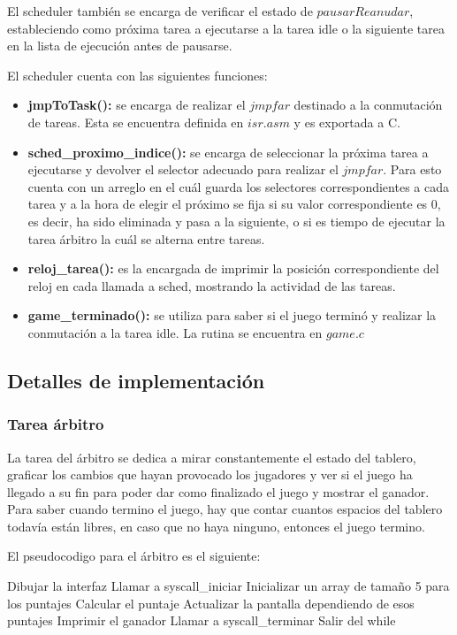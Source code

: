 \documentclass[a4paper,10pt,twoside]{article}
\newenvironment{pseudocodigo}
    {\vspace{0.5em} \begin{algorithmic}}
    {\end{algorithmic} \vspace{0.5em}}
\begin{document}
El scheduler también se encarga de verificar el estado de $pausarReanudar$, estableciendo como próxima tarea a ejecutarse a la tarea idle o la siguiente tarea en la lista de ejecución antes de pausarse.

El scheduler cuenta con las siguientes funciones:
\begin{itemize}
	\item \textbf{jmpToTask():} se encarga de realizar el $jmp far$ destinado a la conmutación de tareas. Esta se encuentra definida en $isr.asm$ y es exportada a C.
	\item \textbf{sched\_proximo\_indice():} se encarga de seleccionar la próxima tarea a ejecutarse y devolver el selector adecuado para realizar el $jmp far$. Para esto cuenta con un arreglo en el cuál guarda los selectores correspondientes a cada tarea y a la hora de elegir el próximo se fija si su valor correspondiente es $0$, es decir, ha sido eliminada y pasa a la siguiente, o si es tiempo de ejecutar la tarea árbitro la cuál se alterna entre tareas.
	\item \textbf{reloj\_tarea():} es la encargada de imprimir la posición correspondiente del reloj en cada llamada a sched, mostrando la actividad de las tareas.
	\item \textbf{game\_terminado():} se utiliza para saber si el juego terminó y realizar la conmutación a la tarea idle. La rutina se encuentra en $game.c$
\end{itemize}


\subsection{Detalles de implementación}


\subsubsection{Tarea árbitro}

La tarea del árbitro se dedica a mirar constantemente el estado del tablero, graficar los cambios que hayan provocado los jugadores y ver si el juego ha llegado a su fin para poder dar como finalizado el juego y mostrar el ganador.
Para saber cuando termino el juego, hay que contar cuantos espacios del tablero todavía están libres, en caso que no haya ninguno, entonces el juego termino.

El pseudocodigo para el árbitro es el siguiente:

\begin{pseudocodigo}
  \STATE Dibujar la interfaz
  \STATE Llamar a syscall\_iniciar
  \STATE Inicializar un array de tamaño 5 para los puntajes
  \STATE
    \STATE Calcular el puntaje
    \STATE Actualizar la pantalla dependiendo de esos puntajes
    \STATE
      \STATE Imprimir el ganador
      \STATE Llamar a syscall\_terminar
      \STATE Salir del while
    \ENDIF
  \ENDWHILE
  \STATE
\end{pseudocodigo}
\end{document}
